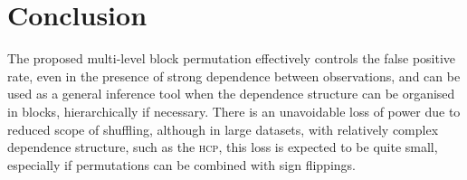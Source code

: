 \section{Conclusion}

The proposed multi-level block permutation effectively controls the false positive rate, even in the presence of strong dependence between observations, and can be used as a general inference tool when the dependence structure can be organised in blocks, hierarchically if necessary. There is an unavoidable loss of power due to reduced scope of shuffling, although in large datasets, with relatively complex dependence structure, such as the \textsc{hcp}, this loss is expected to be quite small, especially if permutations can be combined with sign flippings.
